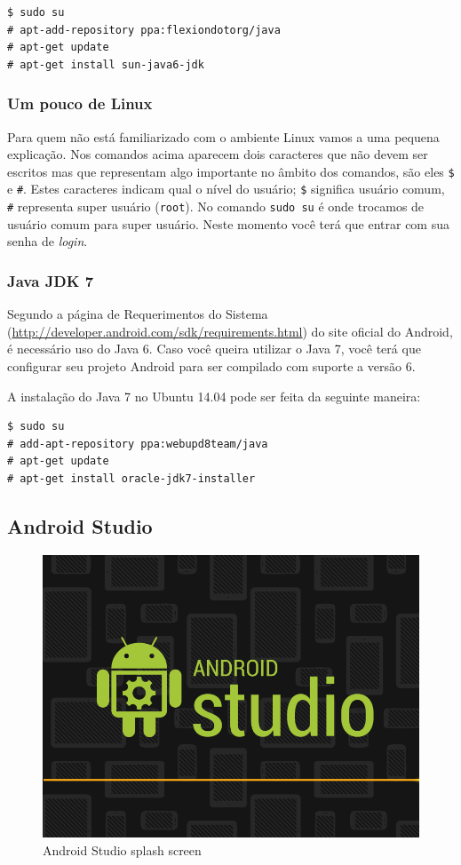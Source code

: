 \begin{verbatim}
$ sudo su
# apt-add-repository ppa:flexiondotorg/java
# apt-get update
# apt-get install sun-java6-jdk
\end{verbatim}
\subsubsection{Um pouco de Linux}

Para quem não está familiarizado com o ambiente Linux vamos a uma
pequena explicação. Nos comandos acima aparecem dois caracteres que não
devem ser escritos mas que representam algo importante no âmbito dos
comandos, são eles \texttt{\$} e \texttt{\#}. Estes caracteres indicam
qual o nível do usuário; \texttt{\$} significa usuário comum,
\texttt{\#} representa super usuário (\texttt{root}). No comando
\texttt{sudo su} é onde trocamos de usuário comum para super usuário.
Neste momento você terá que entrar com sua senha de \emph{login}.

\subsubsection{Java JDK 7}

Segundo a página de Requerimentos do Sistema
(\url{http://developer.android.com/sdk/requirements.html}) do site
oficial do Android, é necessário uso do Java 6. Caso você queira
utilizar o Java 7, você terá que configurar seu projeto Android para ser
compilado com suporte a versão 6.

A instalação do Java 7 no Ubuntu 14.04 pode ser feita da seguinte
maneira:

\begin{verbatim}
$ sudo su
# add-apt-repository ppa:webupd8team/java
# apt-get update
# apt-get install oracle-jdk7-installer
\end{verbatim}
\subsection{Android Studio}

\begin{figure}[h]
\centering
\includegraphics[scale=0.4]{img/preparando-ambiente/android-studio-splash.png}
\caption{Android Studio splash screen}
\end{figure}

